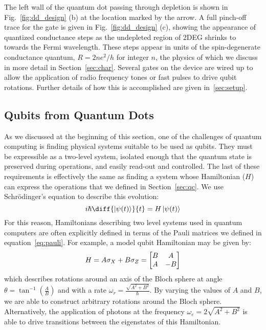 The left wall of the quantum dot passing through depletion is shown in Fig.~\ref{fig:dd_design} (b) at the
location marked by the arrow. A full pinch-off trace for the gate is given in Fig.~\ref{fig:dd_design} (c), showing the appearance of quantized
conductance steps as the undepleted region of 2DEG shrinks to towards the Fermi wavelength. These steps appear in units of the spin-degenerate conductance quantum,
$R = 2 n e^2/h$ for integer $n$, the physics of which we discuss in more detail in Section~\ref{sec:char}. Several gates on the device
are wired up to allow the application of radio frequency tones or fast pulses to drive qubit rotations.
Further details of how this is accomplished are given in~\ref{sec:setup}.

\subsection{Qubits from Quantum Dots}
\label{sec:dotqubits}
As we discussed at the beginning of this section, one of the challenges of quantum computing is finding physical systems
suitable to be used as qubits. They must be expressible as a two-level system, isolated enough that the quantum state is
preserved during operations, and easily read-out and controlled. The last of these requirements is effectively the
same as finding a system whose Hamiltonian ($H$) can express the operations that we defined in Section~\ref{sec:qc}. We use
Schrödinger's equation to describe this evolution:
\begin{equation}
  i \hbar \diff{\ket{\psi(t)}}{t} = H \ket{\psi(t)}
\end{equation}
For this reason, Hamiltonians describing two level systems used in quantum computers are often explicitly defined in terms of
the Pauli matrices we defined in equation~\ref{eq:pauli}. For example, a model qubit Hamiltonian may be given by:
\begin{equation}
  H = A \sigma_X + B \sigma_Z = \begin{bmatrix}B&A\\A&-B\end{bmatrix}
\end{equation}
which describes rotations around an axis of the Bloch sphere at angle $\theta = \tan^{-1}\left(\tfrac{A}{B}\right)$ and with a rate
$\omega_r = \tfrac{\sqrt{A^2 + B^2}}{\hbar}$. By varying the values of $A$ and $B$, we are able to construct arbitrary
rotations around the Bloch sphere. Alternatively, the application of photons at the frequency
$\omega_e = 2\sqrt{A^2 + B^2}$ is able to drive transitions between the eigenstates of this Hamiltonian.

